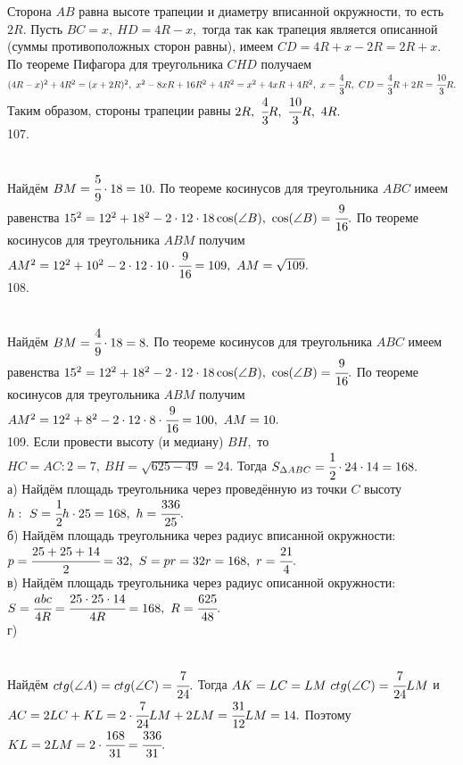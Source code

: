 Сторона $AB$ равна высоте трапеции и диаметру вписанной окружности, то есть $2R.$ Пусть $BC=x,\ HD=4R-x,$ тогда так как трапеция является описанной (суммы противоположных сторон равны), имеем $CD=4R+x-2R=2R+x.$ По теореме Пифагора для треугольника $CHD$ получаем $(4R-x)^2+4R^2=(x+2R)^2,\
x^2-8xR+16R^2+4R^2=x^2+4xR+4R^2,\ x=\cfrac{4}{3}R,\ CD=\cfrac{4}{3}R+2R=\cfrac{10}{3}R.$ Таким образом,
стороны трапеции равны $2R,\ \cfrac{4}{3}R,\ \cfrac{10}{3}R,\ 4R.$\\
107. \begin{figure}[ht!]
\end{figure}\\
Найдём $BM=\cfrac{5}{9}\cdot18=10.$ По теореме косинусов для треугольника $ABC$ имеем равенства $15^2=12^2+18^2-2\cdot12\cdot18\cos(\angle B),\ \cos(\angle B)=\cfrac{9}{16}.$ По теореме косинусов для треугольника $ABM$ получим $AM^2=12^2+10^2-2\cdot12\cdot10\cdot\cfrac{9}{16}=109,\ AM=\sqrt{109}.$\\
108. \begin{figure}[ht!]
\end{figure}\\
Найдём $BM=\cfrac{4}{9}\cdot18=8.$ По теореме косинусов для треугольника $ABC$ имеем равенства $15^2=12^2+18^2-2\cdot12\cdot18\cos(\angle B),\ \cos(\angle B)=\cfrac{9}{16}.$ По теореме косинусов для треугольника $ABM$ получим $AM^2=12^2+8^2-2\cdot12\cdot8\cdot\cfrac{9}{16}=100,\ AM=10.$\\
109. Если провести высоту (и медиану) $BH,$ то $HC=AC:2=7,\ BH=\sqrt{625-49}=24.$ Тогда $S_{\Delta ABC}=\cfrac{1}{2}\cdot24\cdot14=168.$\\
а) Найдём площадь треугольника через проведённую из точки $C$ высоту $h:\ S=\cfrac{1}{2}h\cdot25=168,\ h=\cfrac{336}{25}.$\\
б) Найдём площадь треугольника через радиус вписанной окружности: $p=\cfrac{25+25+14}{2}=32,\ S=pr=32r=168,\ r=\cfrac{21}{4}.$\\
в) Найдём площадь треугольника через радиус описанной окружности: $S=\cfrac{abc}{4R}=\cfrac{25\cdot25\cdot14}{4R}=168,\ R=\cfrac{625}{48}.$\\
г) \begin{figure}[ht!]
\end{figure}\\
Найдём $ctg(\angle A)=ctg(\angle C)=\cfrac{7}{24}.$ Тогда $AK=LC=LM\ ctg(\angle C)=\cfrac{7}{24}LM$ и $AC=2LC+KL=2\cdot\cfrac{7}{24}LM+2LM=\cfrac{31}{12}LM=14.$ Поэтому $KL=2LM=2\cdot\cfrac{168}{31}=\cfrac{336}{31}.$\\
